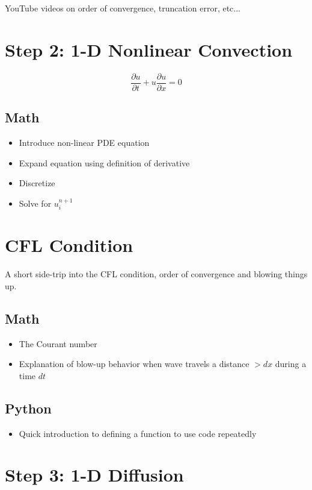 \documentclass[10pt,a4paper]{report}
\begin{document}
\vspace{.5cm}
YouTube videos on order of convergence, truncation error, etc...

\section*{Step 2: 1-D Nonlinear Convection}

\begin{equation}
\frac{\partial u}{\partial t} + u \frac{\partial u}{\partial x} = 0
\end{equation}

\subsection*{Math}
\begin{itemize}
\item[] Introduce non-linear PDE equation
\item[] Expand equation using definition of derivative
\item[] Discretize
\item[] Solve for $u^{n+1}_i$
\end{itemize}

\section*{CFL Condition}
A short side-trip into the CFL condition, order of convergence and blowing things up.

\subsection*{Math}
\begin{itemize}
\item[] The Courant number
\item[] Explanation of blow-up behavior when wave travels a distance $> dx$ during a time $dt$
\end{itemize}

\subsection*{Python}
\begin{itemize}
\item[] Quick introduction to defining a function to use code repeatedly
\end{itemize}


\section*{Step 3: 1-D Diffusion}
\end{document}
